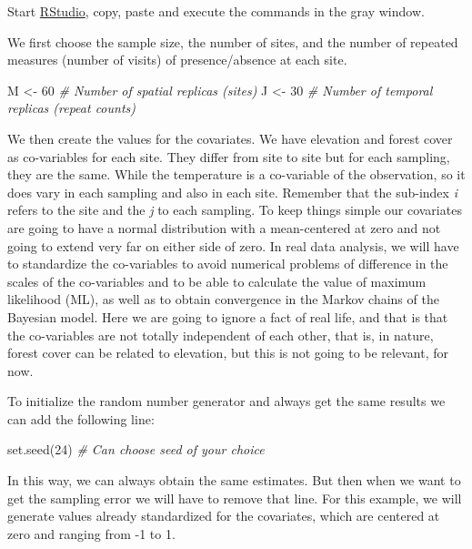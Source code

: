 \documentclass[
]{book}
\newenvironment{Shaded}{\begin{snugshade}}{\end{snugshade}}
\newcommand{\CommentTok}[1]{\textcolor[rgb]{0.56,0.35,0.01}{\textit{#1}}}
\newcommand{\DecValTok}[1]{\textcolor[rgb]{0.00,0.00,0.81}{#1}}
\newcommand{\FunctionTok}[1]{\textcolor[rgb]{0.00,0.00,0.00}{#1}}
\newcommand{\NormalTok}[1]{#1}
\newcommand{\OtherTok}[1]{\textcolor[rgb]{0.56,0.35,0.01}{#1}}
\begin{document}
Start \href{http://www.rstudio.com/}{RStudio}, copy, paste and execute the commands in the gray window.

We first choose the sample size, the number of sites, and the number of repeated measures (number of visits) of presence/absence at each site.

\begin{Shaded}
\begin{Highlighting}[]
\NormalTok{M }\OtherTok{\textless{}{-}} \DecValTok{60} \CommentTok{\# Number of spatial replicas (sites)}
\NormalTok{J }\OtherTok{\textless{}{-}} \DecValTok{30} \CommentTok{\# Number of temporal replicas (repeat counts)}
\end{Highlighting}
\end{Shaded}

We then create the values for the covariates. We have elevation and forest cover as co-variables for each site. They differ from site to site but for each sampling, they are the same. While the temperature is a co-variable of the observation, so it does vary in each sampling and also in each site. Remember that the sub-index \emph{i} refers to the site and the \emph{j} to each sampling. To keep things simple our covariates are going to have a normal distribution with a mean-centered at zero and not going to extend very far on either side of zero. In real data analysis, we will have to standardize the co-variables to avoid numerical problems of difference in the scales of the co-variables and to be able to calculate the value of maximum likelihood (ML), as well as to obtain convergence in the Markov chains of the Bayesian model. Here we are going to ignore a fact of real life, and that is that the co-variables are not totally independent of each other, that is, in nature, forest cover can be related to elevation, but this is not going to be relevant, for now.

To initialize the random number generator and always get the same results we can add the following line:

\begin{Shaded}
\begin{Highlighting}[]
\FunctionTok{set.seed}\NormalTok{(}\DecValTok{24}\NormalTok{) }\CommentTok{\# Can choose seed of your choice}
\end{Highlighting}
\end{Shaded}

In this way, we can always obtain the same estimates. But then when we want to get the sampling error we will have to remove that line. For this example, we will generate values already standardized for the covariates, which are centered at zero and ranging from -1 to 1.
\end{document}
